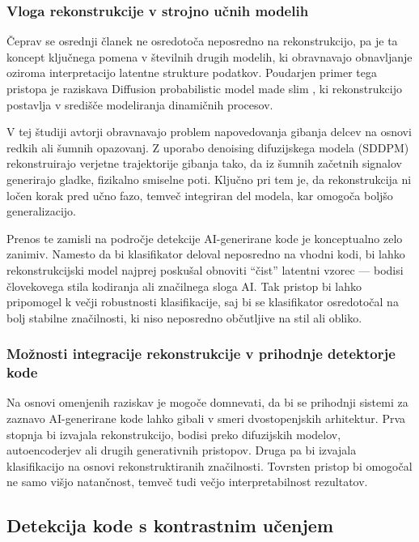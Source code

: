\documentclass[sigconf,nonacm]{acmart}
\begin{document}
\subsubsection{Vloga rekonstrukcije v strojno učnih modelih}
Čeprav se osrednji članek ne osredotoča neposredno na rekonstrukcijo, pa je ta koncept ključnega pomena v številnih drugih modelih, ki obravnavajo obnavljanje oziroma interpretacijo latentne strukture podatkov. Poudarjen primer tega pristopa je raziskava Diffusion probabilistic model made slim \cite{yang2023diffusion}, ki rekonstrukcijo postavlja v središče modeliranja dinamičnih procesov.

V tej študiji avtorji obravnavajo problem napovedovanja gibanja delcev na osnovi redkih ali šumnih opazovanj. Z uporabo denoising difuzijskega modela (\acrshort{SDDPM}) rekonstruirajo verjetne trajektorije gibanja tako, da iz šumnih začetnih signalov generirajo gladke, fizikalno smiselne poti. Ključno pri tem je, da rekonstrukcija ni ločen korak pred učno fazo, temveč integriran del modela, kar omogoča boljšo generalizacijo.

Prenos te zamisli na področje detekcije AI-generirane kode je konceptualno zelo zanimiv. Namesto da bi klasifikator deloval neposredno na vhodni kodi, bi lahko rekonstrukcijski model najprej poskušal obnoviti “čist” latentni vzorec — bodisi človekovega stila kodiranja ali značilnega sloga AI. Tak pristop bi lahko pripomogel k večji robustnosti klasifikacije, saj bi se klasifikator osredotočal na bolj stabilne značilnosti, ki niso neposredno občutljive na stil ali obliko.

\subsubsection{Možnosti integracije rekonstrukcije v prihodnje detektorje kode}
Na osnovi omenjenih raziskav je mogoče domnevati, da bi se prihodnji sistemi za zaznavo AI-generirane kode lahko gibali v smeri dvostopenjskih arhitektur. 
Prva stopnja bi izvajala rekonstrukcijo, bodisi preko difuzijskih modelov, autoencoderjev ali drugih generativnih pristopov. 
Druga pa bi izvajala klasifikacijo na osnovi rekonstruktiranih značilnosti. Tovrsten pristop bi omogočal ne samo višjo natančnost, temveč tudi večjo interpretabilnost rezultatov.

\subsection{Detekcija kode s kontrastnim učenjem}
\end{document}
